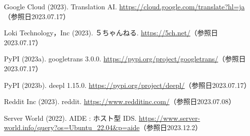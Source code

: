 \documentclass[b5paper,12pt,dvipdfmx]{jsreport}
\begin{document}
\begin{thebibliography}{99}
Google Cloud (2023). Translation AI. \url{https://cloud.google.com/translate?hl=ja}（参照日2023.07.17）

Loki Technology，Inc (2023). ５ちゃんねる. \url{https://5ch.net/}（参照日2023.07.17）

PyPI (2023a). googletrans 3.0.0. \url{https://pypi.org/project/googletrans/}（参照日2023.07.17）

PyPI (2023b). deepl 1.15.0. \url{https://pypi.org/project/deepl/}（参照日2023.07.17）

Reddit Inc (2023). reddit. \url{https://www.redditinc.com/}（参照日2023.07.08）

Server World (2022). AIDE : ホスト型 IDS. \url{https://www.server-world.info/query?os=Ubuntu_22.04&p=aide}（参照日2023.12.2）

\end{thebibliography}
    
\end{document}

